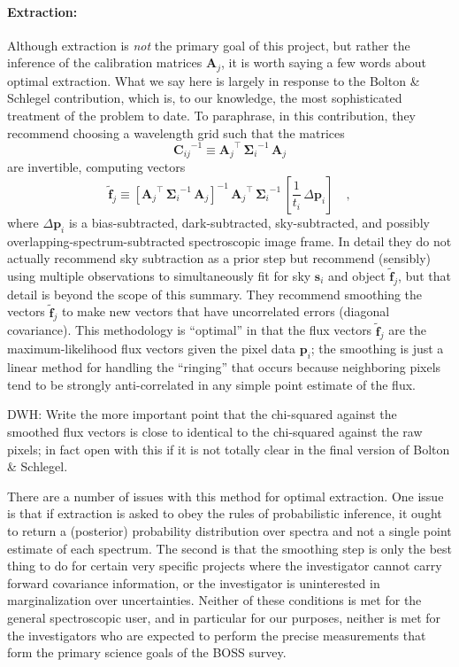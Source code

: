 \documentclass[12pt]{article}
\newcommand{\inverse}[1]{{#1}^{-1}}
\newcommand{\transpose}[1]{{#1}^{\scriptscriptstyle \top}}
\newcommand{\hmatrix}[1]{\boldsymbol{#1}}
\newcommand{\Amatrix}{\hmatrix{A}}
\newcommand{\pixels}{\hmatrix{p}}
\newcommand{\fluxLSF}{\hmatrix{\tilde{f}}}
\newcommand{\sky}{\hmatrix{s}}
\newcommand{\pixelvariance}{\hmatrix{\Sigma}}
\newcommand{\covariance}{\hmatrix{C}}
\begin{document}
\paragraph{Extraction:}
Although extraction is \emph{not} the primary goal of this project,
but rather the inference of the calibration matrices $\Amatrix_j$, it
is worth saying a few words about optimal extraction.  What we say
here is largely in response to the Bolton \& Schlegel contribution,
which is, to our knowledge, the most sophisticated treatment of the
problem to date.  To paraphrase, in this contribution, they recommend
choosing a wavelength grid such that the matrices
\begin{equation}
\inverse{\covariance_{ij}} \equiv
  \transpose{\Amatrix_j}\,\inverse{\pixelvariance_i}\,\Amatrix_j
\end{equation}
are invertible, computing vectors
\begin{equation}
\fluxLSF_j \equiv
  \inverse{[\transpose{\Amatrix_j}\,\inverse{\pixelvariance_i}\,\Amatrix_j]}
  \,\transpose{\Amatrix_j}\,\inverse{\pixelvariance_i}
  \,\left[\frac{1}{t_i}\,\Delta\pixels_i\right] \quad ,
\end{equation}
where $\Delta\pixels_i$ is a bias-subtracted, dark-subtracted,
sky-subtracted, and possibly overlapping-spectrum-subtracted
spectroscopic image frame.  In detail they do not actually recommend
sky subtraction as a prior step but recommend (sensibly) using
multiple observations to simultaneously fit for sky $\sky_i$ and
object $\fluxLSF_j$, but that detail is beyond the scope of this
summary.  They recommend smoothing the vectors $\fluxLSF_j$ to make
new vectors that have uncorrelated errors (diagonal covariance).  This
methodology is ``optimal'' in that the flux vectors $\fluxLSF_j$ are
the maximum-likelihood flux vectors given the pixel data $\pixels_i$;
the smoothing is just a linear method for handling the ``ringing''
that occurs because neighboring pixels tend to be strongly
anti-correlated in any simple point estimate of the flux.

DWH: Write the more important point that the chi-squared against the
smoothed flux vectors is close to identical to the chi-squared against
the raw pixels; in fact open with this if it is not totally clear in
the final version of Bolton \& Schlegel.

There are a number of issues with this method for optimal extraction.
One issue is that if extraction is asked to obey the rules of
probabilistic inference, it ought to return a (posterior) probability
distribution over spectra and not a single point estimate of each
spectrum.  The second is that the smoothing step is only the best
thing to do for certain very specific projects where the investigator
cannot carry forward covariance information, or the investigator is
uninterested in marginalization over uncertainties.  Neither of these
conditions is met for the general spectroscopic user, and in
particular for our purposes, neither is met for the investigators who
are expected to perform the precise measurements that form the primary
science goals of the BOSS survey.
\end{document}
